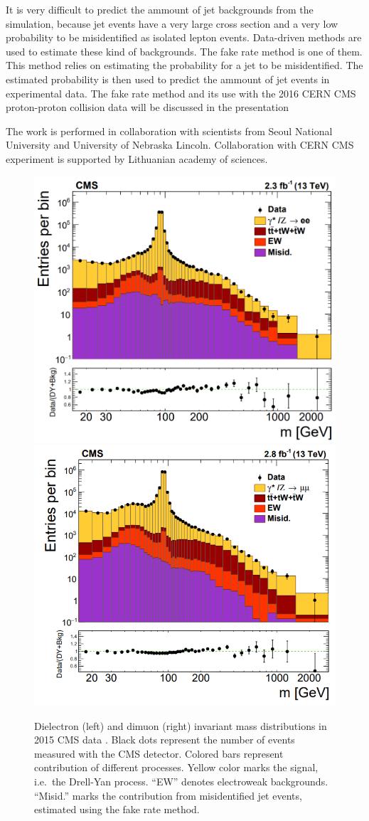 \documentclass[a4paper,10pt,english]{article}
\begin{document}
It is very difficult to predict the ammount of jet backgrounds from the simulation, because jet events have a very
large cross section and a very low probability to be misidentified as isolated lepton events.
Data-driven methods are used to estimate these kind of backgrounds.
The fake rate method is one of them.
This method relies on estimating the probability for a jet to be misidentified.
The estimated probability is then used to predict the ammount of jet events in experimental data.
The fake rate method and its use with the 2016 CERN CMS proton-proton collision data will be discussed in the presentation

The work is performed in collaboration with scientists from Seoul National University and University of Nebraska Lincoln.
Collaboration with CERN CMS experiment is supported by Lithuanian academy of sciences.
 
\vspace{-0.3cm}
\begin{figure}[H]
	\includegraphics[width=.4\linewidth]{Figure1.png}
	\includegraphics[width=.4\linewidth]{Figure2.png}
\vspace{-0.2cm}
\caption{Dielectron (left) and dimuon (right) invariant mass distributions in 2015 CMS data \cite{DY13}.
      Black dots represent the number of events measured with the CMS detector.
      Colored bars represent contribution of different processes.
      Yellow color marks the signal, i.e.\ the Drell-Yan process.
      ``EW'' denotes electroweak backgrounds.
      ``Misid.'' marks the contribution from misidentified jet events, estimated using the fake rate method.}
\end{figure}
\end{document}
